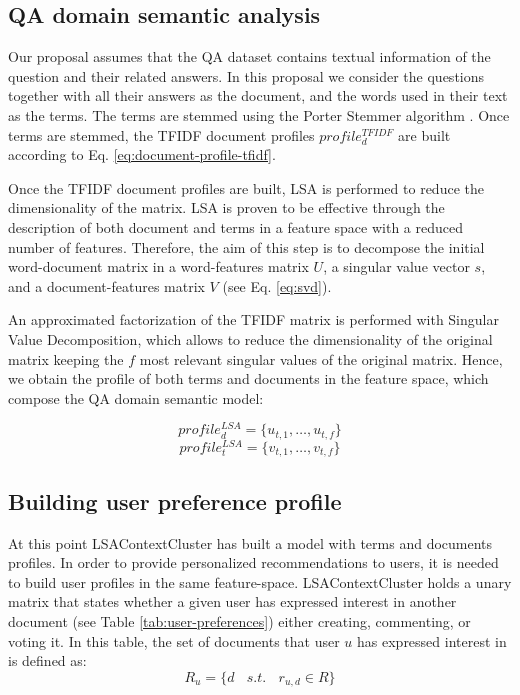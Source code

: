 \documentclass[preprint]{elsarticle}
\begin{document}
\begin{spacing}{1.5}
\subsection{QA domain semantic analysis}
\label{sec:proposal-qa-semantic-analysis}

Our proposal assumes that the QA dataset contains textual information of the question and their related answers. In this proposal we consider the questions together with all their answers as the document, and the words used in their text as the terms. The terms are stemmed using the Porter Stemmer algorithm \citep{Porter1980}. Once terms are stemmed, the TFIDF document profiles $profile^{TFIDF}_{d}$ are built according to Eq. \ref{eq:document-profile-tfidf}.

Once the TFIDF document profiles are built, LSA is performed to reduce the dimensionality of the matrix. LSA is proven to be effective through the description of both document and terms in a feature space with a reduced number of features. Therefore, the aim of this step is to decompose the initial word-document matrix in a word-features matrix $U$, a singular value vector $s$, and a document-features matrix $V$ (see Eq. \ref{eq:svd}).

An approximated factorization of the TFIDF matrix is performed with Singular Value Decomposition, which allows to reduce the dimensionality of the original matrix keeping the $f$ most relevant singular values of the original matrix. Hence, we obtain the profile of both terms and documents in the feature space, which compose the QA domain semantic model:

\begin{equation}
	profile^{LSA}_d = \{ u_{t,1},\dots, u_{t,f}\}
\end{equation}
\begin{equation}
	profile^{LSA}_t = \{ v_{t,1},\dots, v_{t,f}\}
\end{equation}

\subsection{Building user preference profile}

At this point LSAContextCluster has built a model with terms and documents profiles. In order to provide personalized recommendations to users, it is needed to build user profiles in the same feature-space. LSAContextCluster holds a unary matrix that states whether a given user has expressed interest in another document (see Table \ref{tab:user-preferences}) either creating, commenting, or voting it. In this table, the set of documents that user $u$ has expressed interest in is defined as:
\begin{equation}
	R_{u} = \{d ~~~~s.t.~~~~r_{u,d} \in R \}
\end{equation}


\end{spacing}
\end{document}
